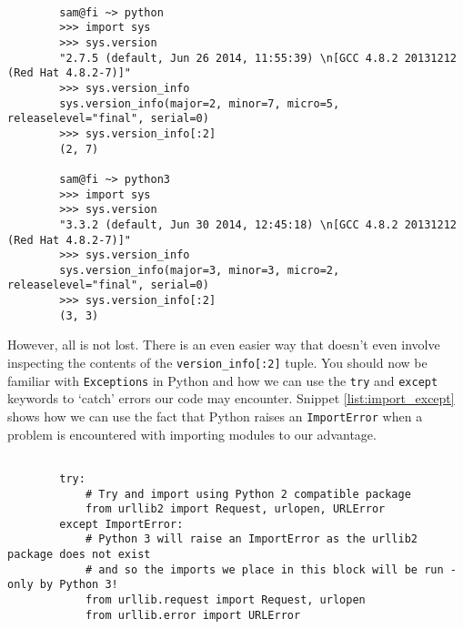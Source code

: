 \documentclass[a4paper]{article}
\begin{document}
\begin{listing}[H]
    \caption[]{Fetching Python's version number using the \texttt{sys} package}
    \label{list:get_version}
    \begin{verbatim}

        sam@fi ~> python
        >>> import sys
        >>> sys.version
        "2.7.5 (default, Jun 26 2014, 11:55:39) \n[GCC 4.8.2 20131212 (Red Hat 4.8.2-7)]"
        >>> sys.version_info
        sys.version_info(major=2, minor=7, micro=5, releaselevel="final", serial=0)
        >>> sys.version_info[:2]
        (2, 7)

        sam@fi ~> python3
        >>> import sys
        >>> sys.version
        "3.3.2 (default, Jun 30 2014, 12:45:18) \n[GCC 4.8.2 20131212 (Red Hat 4.8.2-7)]"
        >>> sys.version_info
        sys.version_info(major=3, minor=3, micro=2, releaselevel="final", serial=0)
        >>> sys.version_info[:2]
        (3, 3)

    \end{verbatim}
\end{listing}

However, all is not lost. There is an even easier way that doesn't even involve
inspecting the contents of the \texttt{version\_info[:2]} tuple. You should now
be familiar with \texttt{Exceptions} in Python and how we can use the \texttt{try}
and \texttt{except} keywords to `catch' errors our code may encounter.
Snippet \ref{list:import_except} shows how we can use the fact that Python raises
an \texttt{ImportError} when a problem is encountered with importing modules to
our advantage.

\begin{listing}[H]
    \caption[]{Taking advantage of \texttt{ImportError} to support Python 2 and 3}
    \label{list:import_except}
    \begin{verbatim}

        try:
            # Try and import using Python 2 compatible package
            from urllib2 import Request, urlopen, URLError
        except ImportError:
            # Python 3 will raise an ImportError as the urllib2 package does not exist
            # and so the imports we place in this block will be run - only by Python 3!
            from urllib.request import Request, urlopen
            from urllib.error import URLError

    \end{verbatim}
\end{listing}
\end{document}
